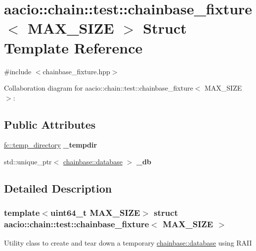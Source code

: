 \hypertarget{structaacio_1_1chain_1_1test_1_1chainbase__fixture}{}\section{aacio\+:\+:chain\+:\+:test\+:\+:chainbase\+\_\+fixture$<$ M\+A\+X\+\_\+\+S\+I\+ZE $>$ Struct Template Reference}
\label{structaacio_1_1chain_1_1test_1_1chainbase__fixture}


{\ttfamily \#include $<$chainbase\+\_\+fixture.\+hpp$>$}



Collaboration diagram for aacio\+:\+:chain\+:\+:test\+:\+:chainbase\+\_\+fixture$<$ M\+A\+X\+\_\+\+S\+I\+ZE $>$\+:
\subsection*{Public Attributes}
\begin{DoxyCompactItemize}
\item 
\mbox{\label{structaacio_1_1chain_1_1test_1_1chainbase__fixture_a3ac55022573f8339c7c269781743b465}} 
\mbox{\hyperlink{classfc_1_1temp__directory}{fc\+::temp\+\_\+directory}} {\bfseries \+\_\+tempdir}
\item 
\mbox{\label{structaacio_1_1chain_1_1test_1_1chainbase__fixture_a91d342e5c59e0b3bc4e40172ff05c3d6}} 
std\+::unique\+\_\+ptr$<$ \mbox{\hyperlink{classchainbase_1_1database}{chainbase\+::database}} $>$ {\bfseries \+\_\+db}
\end{DoxyCompactItemize}


\subsection{Detailed Description}
\subsubsection*{template$<$uint64\+\_\+t M\+A\+X\+\_\+\+S\+I\+ZE$>$\newline
struct aacio\+::chain\+::test\+::chainbase\+\_\+fixture$<$ M\+A\+X\+\_\+\+S\+I\+Z\+E $>$}

Utility class to create and tear down a temporary \mbox{\hyperlink{classchainbase_1_1database}{chainbase\+::database}} using R\+A\+II


